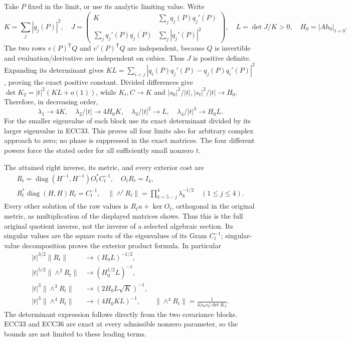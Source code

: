 \documentclass[11pt]{article}
\newcommand{\diag}{\operatorname{diag}}
\begin{document}
Take $P$ fixed in the limit, or use its analytic limiting value. Write
\begin{equation}
 K=\sum_j|q_j(P)|^2,\quad
 J=\begin{pmatrix}
 K&\sum_jq_j(P)\overline{q_j'(P)}\\
 \sum_jq_j'(P)\overline{q_j(P)}&\sum_j|q_j'(P)|^2
 \end{pmatrix},\quad L=\det J/K>0,\quad H_0=|Ah_0|_{t=0}.
 \tag{ECC34}
\end{equation}
The two rows $v(P)^{\mathsf T}Q$ and $v'(P)^{\mathsf T}Q$ are independent,
because $Q$ is invertible and evaluation/derivative are independent on
cubics. Thus $J$ is positive definite. Expanding its determinant gives
$KL=\sum_{i<j}|q_i(P)q_j'(P)-q_j(P)q_i'(P)|^2$, proving the exact
positive constant. Divided differences give
$\det K_2=|t|^2(KL+o(1))$, while $K_t,C\to K$ and
$|s_0|^2/|t|,|s_t|^2/|t|\to H_0$. Therefore, in decreasing order,
\begin{equation}
 \lambda_1\to4K,\quad
 \lambda_2/|t|\to4H_0K,\quad
 \lambda_3/|t|^2\to L,\quad
 \lambda_4/|t|^3\to H_0L.
 \tag{ECC35}
\end{equation}
For the smaller eigenvalue of each block use its exact determinant
divided by its larger eigenvalue in ECC33. This proves all four limits
also for arbitrary complex approach to zero; no phase is suppressed in
the exact matrices. The four different powers force the stated order
for all sufficiently small nonzero $t$.

The attained right inverse, its metric, and every exterior cost are
\begin{equation}
 \begin{gathered}
 R_t=\diag(H^{-1},H^{-1})O_t^*C_t^{-1},\quad
 O_tR_t=I_4,\\ R_t^*\diag(H,H)R_t=C_t^{-1},\quad
 \|\wedge^jR_t\|=\prod_{k=5-j}^4\lambda_k^{-1/2}\quad(1\le j\le4).
 \end{gathered}
 \tag{ECC36}
\end{equation}
Every other solution of the raw values is $R_tu+\ker O_t$, orthogonal
in the original metric, as multiplication of the displayed matrices
shows. Thus this is the full original quotient inverse, not the inverse
of a selected algebraic section. Its singular values are the square
roots of the eigenvalues of its Gram $C_t^{-1}$; singular-value
decomposition proves the exterior product formula. In particular
\begin{equation}
 \begin{aligned}
 |t|^{3/2}\|R_t\|&\longrightarrow(H_0L)^{-1/2},\\
 |t|^{5/2}\|\wedge^2R_t\|&\longrightarrow(H_0^{1/2}L)^{-1},\\
 |t|^3\|\wedge^3R_t\|&\longrightarrow(2H_0L\sqrt K)^{-1},\\
 |t|^3\|\wedge^4R_t\|&\longrightarrow(4H_0KL)^{-1},\qquad
 \|\wedge^4R_t\|=\frac1{4|s_0s_t|\det K_2}.
 \end{aligned}\tag{ECC37}
\end{equation}
The determinant expression follows directly from the two covariance
blocks. ECC33 and ECC36 are exact at every admissible nonzero parameter,
so the bounds are not limited to these leading terms.
\end{document}
